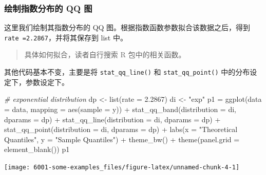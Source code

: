 \documentclass[
]{book}
\newenvironment{Shaded}{\begin{snugshade}}{\end{snugshade}}
\newcommand{\AttributeTok}[1]{\textcolor[rgb]{0.77,0.63,0.00}{#1}}
\newcommand{\CommentTok}[1]{\textcolor[rgb]{0.56,0.35,0.01}{\textit{#1}}}
\newcommand{\FloatTok}[1]{\textcolor[rgb]{0.00,0.00,0.81}{#1}}
\newcommand{\FunctionTok}[1]{\textcolor[rgb]{0.00,0.00,0.00}{#1}}
\newcommand{\NormalTok}[1]{#1}
\newcommand{\OtherTok}[1]{\textcolor[rgb]{0.56,0.35,0.01}{#1}}
\newcommand{\SpecialCharTok}[1]{\textcolor[rgb]{0.00,0.00,0.00}{#1}}
\newcommand{\StringTok}[1]{\textcolor[rgb]{0.31,0.60,0.02}{#1}}
\begin{document}
\hypertarget{ux7ed8ux5236ux6307ux6570ux5206ux5e03ux7684-qq-ux56fe}{%
\subsubsection{绘制指数分布的 QQ 图}\label{ux7ed8ux5236ux6307ux6570ux5206ux5e03ux7684-qq-ux56fe}}

这里我们绘制其指数分布的 QQ 图。根据指数函数参数拟合该数据之后，得到\texttt{rate\ =2.2867}，并将其保存到 list 中。

\begin{quote}
具体如何拟合，读者自行搜索 R 包中的相关函数。
\end{quote}

其他代码基本不变，主要是将 \texttt{stat\_qq\_line()} 和 \texttt{stat\_qq\_point()} 中的分布设定下，参数设定下。

\begin{Shaded}
\begin{Highlighting}[]
\CommentTok{\# exponential distribution}
\NormalTok{dp }\OtherTok{\textless{}{-}} \FunctionTok{list}\NormalTok{(}\AttributeTok{rate =} \FloatTok{2.2867}\NormalTok{)}
\NormalTok{di }\OtherTok{\textless{}{-}} \StringTok{"exp"}
\NormalTok{p1 }\OtherTok{=} \FunctionTok{ggplot}\NormalTok{(}\AttributeTok{data =}\NormalTok{ data, }\AttributeTok{mapping =} \FunctionTok{aes}\NormalTok{(}\AttributeTok{sample =}\NormalTok{ y)) }\SpecialCharTok{+}
  \FunctionTok{stat\_qq\_band}\NormalTok{(}\AttributeTok{distribution =}\NormalTok{ di, }\AttributeTok{dparams =}\NormalTok{ dp) }\SpecialCharTok{+}
  \FunctionTok{stat\_qq\_line}\NormalTok{(}\AttributeTok{distribution =}\NormalTok{ di, }\AttributeTok{dparams =}\NormalTok{ dp) }\SpecialCharTok{+}
  \FunctionTok{stat\_qq\_point}\NormalTok{(}\AttributeTok{distribution =}\NormalTok{ di, }\AttributeTok{dparams =}\NormalTok{ dp) }\SpecialCharTok{+}
  \FunctionTok{labs}\NormalTok{(}\AttributeTok{x =} \StringTok{"Theoretical Quantiles"}\NormalTok{, }\AttributeTok{y =} \StringTok{"Sample Quantiles"}\NormalTok{) }\SpecialCharTok{+}
  \FunctionTok{theme\_bw}\NormalTok{() }\SpecialCharTok{+} 
  \FunctionTok{theme}\NormalTok{(}\AttributeTok{panel.grid =} \FunctionTok{element\_blank}\NormalTok{())}
\NormalTok{p1}
\end{Highlighting}
\end{Shaded}

\begin{center}\texttt{[image: 6001-some-examples\_files/figure-latex/unnamed-chunk-4-1]} \end{center}
\end{document}
